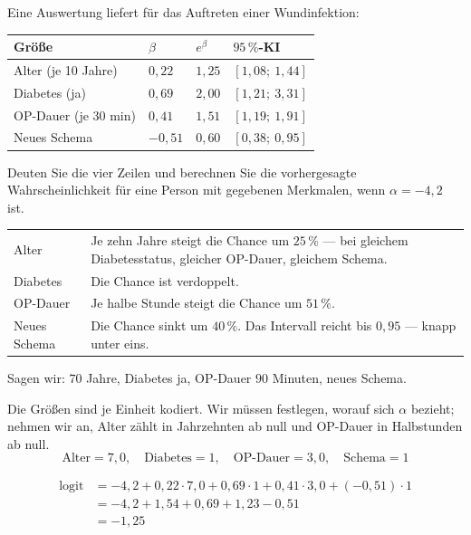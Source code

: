\begin{aufgabe}
Eine Auswertung liefert für das Auftreten einer Wundinfektion:
\begin{center}
{\small
\renewcommand{\arraystretch}{1.4}
\begin{tabular}{@{}P{3.0cm}P{1.6cm}P{1.6cm}P{2.0cm}@{}}
\toprule
\textbf{Größe} & $\beta$ & $e^{\beta}$ & \textbf{$95\,\%$-KI}\\
\midrule
Alter (je 10 Jahre) & $0{,}22$ & $1{,}25$ & $[1{,}08;\ 1{,}44]$\\
Diabetes (ja) & $0{,}69$ & $2{,}00$ & $[1{,}21;\ 3{,}31]$\\
OP-Dauer (je 30 min) & $0{,}41$ & $1{,}51$ & $[1{,}19;\ 1{,}91]$\\
Neues Schema & $-0{,}51$ & $0{,}60$ & $[0{,}38;\ 0{,}95]$\\
\bottomrule
\end{tabular}}
\end{center}
Deuten Sie die vier Zeilen und berechnen Sie die vorhergesagte Wahrscheinlichkeit für eine Person mit gegebenen Merkmalen, wenn $\alpha = -4{,}2$ ist.

\loesung
{}
\begin{center}
{\small
\renewcommand{\arraystretch}{1.5}
\begin{tabular}{@{}P{2.4cm}P{6.2cm}@{}}
\toprule
Alter & Je zehn Jahre steigt die Chance um $25\,\%$ --- bei gleichem Diabetesstatus, gleicher OP-Dauer, gleichem Schema.\\
Diabetes & Die Chance ist verdoppelt.\\
OP-Dauer & Je halbe Stunde steigt die Chance um $51\,\%$.\\
Neues Schema & Die Chance sinkt um $40\,\%$. Das Intervall reicht bis $0{,}95$ --- knapp unter eins.\\
\bottomrule
\end{tabular}}
\end{center}

Sagen wir: $70$ Jahre, Diabetes ja, OP-Dauer $90$ Minuten, neues Schema.

Die Größen sind je Einheit kodiert. Wir müssen festlegen, worauf sich $\alpha$ bezieht; nehmen wir an, Alter zählt in Jahrzehnten ab null und OP-Dauer in Halbstunden ab null.
\[ \text{Alter} = 7{,}0, \quad \text{Diabetes} = 1, \quad \text{OP-Dauer} = 3{,}0, \quad \text{Schema} = 1 \]

\begin{align*}
\operatorname{logit} &= -4{,}2 + 0{,}22 \cdot 7{,}0 + 0{,}69 \cdot 1 + 0{,}41 \cdot 3{,}0 + (-0{,}51)\cdot 1\\
&= -4{,}2 + 1{,}54 + 0{,}69 + 1{,}23 - 0{,}51\\
&= -1{,}25
\end{align*}


\end{aufgabe}
